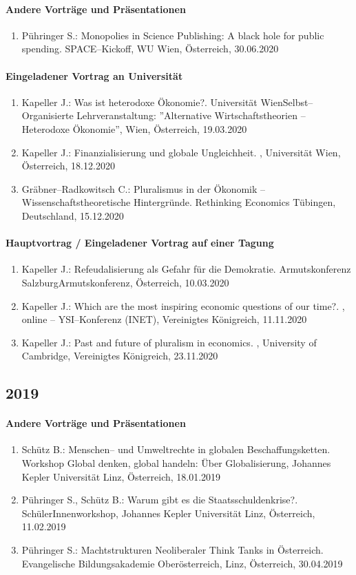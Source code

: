 \paragraph{Andere Vorträge und Präsentationen}
\begin{enumerate}
	\item Pühringer S.: Monopolies in Science Publishing: A black hole for public spending. SPACE--Kickoff, WU Wien, Österreich, 30.06.2020
\end{enumerate}
\paragraph{Eingeladener Vortrag an Universität}
\begin{enumerate}
	\item Kapeller J.: Was ist heterodoxe Ökonomie?. Universität WienSelbst--Organisierte Lehrveranstaltung: ''Alternative Wirtschaftstheorien -- Heterodoxe Ökonomie'', Wien, Österreich, 19.03.2020
	\item Kapeller J.: Finanzialisierung und globale Ungleichheit. , Universität Wien, Österreich, 18.12.2020
	\item Gräbner--Radkowitsch C.: Pluralismus in der Ökonomik -- Wissenschaftstheoretische Hintergründe. Rethinking Economics Tübingen, Deutschland, 15.12.2020
\end{enumerate}
\paragraph{Hauptvortrag / Eingeladener Vortrag auf einer Tagung}
\begin{enumerate}
	\item Kapeller J.: Refeudalisierung als Gefahr für die Demokratie. Armutskonferenz SalzburgArmutskonferenz, Österreich, 10.03.2020
	\item Kapeller J.: Which are the most inspiring economic questions of our time?. , online -- YSI--Konferenz (INET), Vereinigtes Königreich, 11.11.2020
	\item Kapeller J.: Past and future of pluralism in economics. , University of Cambridge, Vereinigtes Königreich, 23.11.2020
\end{enumerate}
\subsection*{2019}
\paragraph{Andere Vorträge und Präsentationen}
\begin{enumerate}
	\item Schütz B.: Menschen-- und Umweltrechte in globalen Beschaffungsketten. Workshop Global denken, global handeln: Über Globalisierung, Johannes Kepler Universität Linz, Österreich, 18.01.2019
	\item Pühringer S., Schütz B.: Warum gibt es die Staatsschuldenkrise?. SchülerInnenworkshop, Johannes Kepler Universität Linz, Österreich, 11.02.2019
	\item Pühringer S.: Machtstrukturen Neoliberaler Think Tanks in Österreich. Evangelische Bildungsakademie Oberösterreich, Linz, Österreich, 30.04.2019
\end{enumerate}
